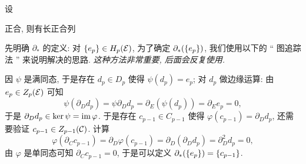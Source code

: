 \begin{Lemma}[Zig--zag 引理]
	设
	\begin{center}
	\end{center}
	正合, 则有长正合列
	\begin{center}
	\end{center}
\end{Lemma}
\begin{Proof}
	先明确 $ \partial_* $ 的定义: 对 $ \left\{ e_p \right\}\in H_p(\mathcal{E}) $, 为了确定 $ \partial_*(\left\{ e_p \right\}) $, 我们使用以下的 `` 图追踪法 '' 来说明解决的思路. \textit{这种方法非常重要, 后面会反复使用.}
	\begin{center}
	\end{center}
	因 $ \psi $ 是满同态, 于是存在 $ d_p\in D_p $ 使得 $ \psi(d_p)=e_p $; 对 $ d_p $ 做边缘运算: 由 $ e_p\in Z_p(\mathcal{E}) $ 可知
	\[
		\psi(\partial_D d_p)=\psi\partial_D d_p=\partial_E(\psi(d_p))=\partial_E e_p=0,
	\]
	于是 $ \partial_D d_p\in\ker\psi=\mathrm{im}\,\varphi $. 于是存在 $ c_{p-1}\in C_{p-1} $ 使得 $ \varphi(c_{p-1})=\partial_D d_p $, 还需要验证 $ c_{p-1}\in Z_{p-1}(\mathcal{C}) $. 计算
	\[
		\varphi(\partial_C c_{p-1})=\partial_D\varphi(c_{p-1})=\partial_D(\partial_D d_p)=\partial_D^2 d_p=0,
	\]
	由 $ \varphi $ 是单同态可知 $ \partial_C c_{p-1}=0 $, 于是可以定义 $ \partial_*(\left\{ e_p \right\})=\left\{ c_{p-1} \right\} $.


\end{Proof}
